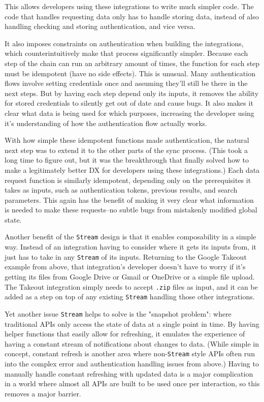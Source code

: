 \documentclass[manuscript,review,anonymous]{acmart}
\begin{document}
This allows developers using these integrations to write much simpler code. The code that handles requesting data only has to handle storing data, instead of also handling checking and storing authentication, and vice versa. 

It also imposes constraints on authentication when building the integrations, which counterintuitively make that process significantly simpler. Because each step of the chain can run an arbitrary amount of times, the function for each step must be idempotent (have no side effects). This is unusual. Many authentication flows involve setting credentials once and assuming they'll still be there in the next steps. But by having each step depend only its inputs, it removes the ability for stored credentials to silently get out of date and cause bugs. It also makes it clear what data is being used for which purposes, increasing the developer using it's understanding of how the authentication flow actually works.

With how simple these idempotent functions made authentication, the natural next step was to extend it to the other parts of the sync process. (This took a long time to figure out, but it was the breakthrough that finally solved how to make a legitimately better DX for developers using these integrations.) Each data request function is similarly idempotent, depending only on the prerequisites it takes as inputs, such as authentication tokens, previous results, and search parameters. This again has the benefit of making it very clear what information is needed to make these requests--no subtle bugs from mistakenly modified global state.

Another benefit of the \texttt{Stream} design is that it enables composability in a simple way. Instead of an integration having to consider where it gets its inputs from, it just has to take in any \texttt{Stream} of its inputs. Returning to the Google Takeout example from above, that integration's developer doesn't have to worry if it's getting its files from Google Drive or Gmail or OneDrive or a simple file upload. The Takeout integration simply needs to accept \texttt{.zip} files as input, and it can be added as a step on top of any existing \texttt{Stream} handling those other integrations. 

Yet another issue \texttt{Stream} helps to solve is the "snapshot problem": where traditional APIs only access the state of data at a single point in time. By having helper functions that easily allow for refreshing, it emulates the experience of having a constant stream of notifications about changes to data. (While simple in concept, constant refresh is another area where non-\texttt{Stream} style APIs often run into the complex error and authentication handling issues from above.) Having to manually handle constant refreshing with updated data is a major complication in a world where almost all APIs are built to be used once per interaction, so this removes a major barrier.
\end{document}
